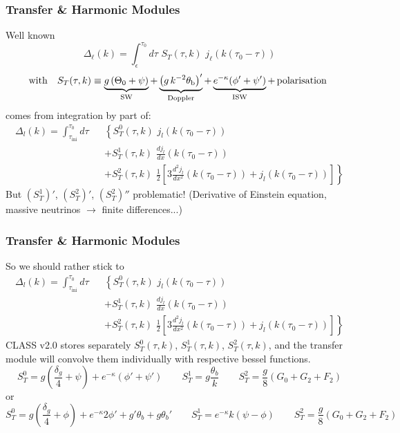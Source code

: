 \begin{frame}[fragile]
\frametitle{Transfer \& Harmonic Modules}

Well known
$$\Delta_\ell (k) = \int_{\epsilon}^{\tau_0} d \tau \,\, S_T(\tau,k) \,\, j_\ell(k(\tau_0-\tau))$$
$${\rm with}~~~S_T(\tau,k) \equiv \mathop{\underbrace{g\left(\Theta_0 + \psi\right)}}_\mathrm{SW} 
+ \mathop{\underbrace{\left(g \, k^{-2} \theta_\mathrm{b}\right)'}}_\mathrm{Doppler}  
+ \mathop{\underbrace{e^{-\kappa} (\phi'+\psi')}}_\mathrm{ISW} + \, \mathrm{polarisation}~$$
comes from integration by part of:
\begin{eqnarray}
\Delta_l (k) = \int_{\tau_\mathrm{ini}}^{\tau_0} d \tau \!\!\!\!\!\!\!\!\!\!\!\!&& \left\{  S_T^0(\tau,k) \,\, j_l(k(\tau_0-\tau))\right. \nonumber \\
&& + S_T^1(\tau,k) \,\, \frac{d j_l}{dx}(k(\tau_0-\tau)) \nonumber \\
&&\left. + S_T^2(\tau,k) \,\, \frac{1}{2}\left[3 \frac{d^2 j_l}{dx^2}(k(\tau_0-\tau)) + j_l(k(\tau_0-\tau)) \right]\right\} \nonumber
\end{eqnarray}
But $(S_T^1)'$, $(S_T^2)'$, $(S_T^2)''$ problematic! (Derivative of Einstein equation, massive neutrinos $\rightarrow$ finite differences...)

\end{frame}


\begin{frame}[fragile]
\frametitle{Transfer \& Harmonic Modules}

So we should rather stick to
\begin{eqnarray}
\Delta_l (k) = \int_{\tau_\mathrm{ini}}^{\tau_0} d \tau \!\!\!\!\!\!\!\!\!\!\!\!&& \left\{  S_T^0(\tau,k) \,\, j_l(k(\tau_0-\tau))\right. \nonumber \\
&& + S_T^1(\tau,k) \,\, \frac{d j_l}{dx}(k(\tau_0-\tau)) \nonumber \\
&&\left. + S_T^2(\tau,k) \,\, \frac{1}{2}\left[3 \frac{d^2 j_l}{dx^2}(k(\tau_0-\tau)) + j_l(k(\tau_0-\tau)) \right]\right\} \nonumber
\end{eqnarray}
CLASS v2.0 stores separately  $S_T^0(\tau,k)$, $S_T^1(\tau,k)$, $S_T^2(\tau,k)$, and the transfer module will convolve them individually with respective bessel functions.
$$
S_T^0 = g \left(\frac{\delta_g}{4} +\psi \right) + e^{-\kappa} (\phi' + \psi') \qquad
S_T^1 = g \frac{\theta_b}{k}\qquad
S_T^2 = \frac{g}{8} \left( G_0 + G_2 + F_2 \right) 
$$
or
$$
S_T^0 = g \left(\frac{\delta_g}{4} +\phi \right) + e^{-\kappa} 2 \phi'  + g'\theta_b + g \theta_b' \qquad
S_T^1 = e^{-\kappa} k (\psi-\phi) \qquad
S_T^2 = \frac{g}{8} \left( G_0 + G_2 + F_2 \right) 
$$

\end{frame}


